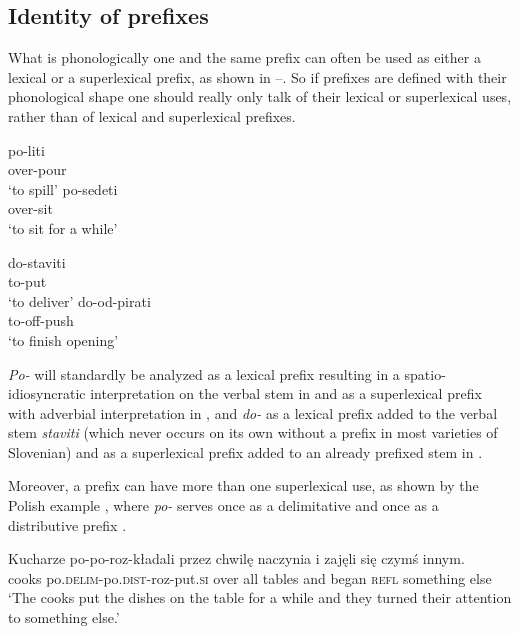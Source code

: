 \documentclass[output=paper,colorlinks,citecolor=brown]{langscibook}
\begin{document}
\subsection{Identity of prefixes}\label{sec:whatWeKnowSlo}
 
What is phonologically one and the same prefix can often be used as either a lexical or a superlexical prefix, as shown in --. So if prefixes are defined with their phonological shape one should really only talk of their lexical or superlexical uses, rather than of lexical and superlexical prefixes.

\ea \label{ex:lexPOsuperPO}
\ea 
\gll po-liti \\
 {over}-pour\\
 \glt `to spill'\label{ex:lexPOsuperPOlex}
\ex \gll po-sedeti \\
 {over}-sit\\
\glt `to sit for a while'\label{ex:lexPOsuperPOsup} 
\z 
\z

\ea \label{ex:lexNAsuperNA}
\ea
\gll do-staviti \\
 {to}-put\\
 \glt `to deliver' \label{ex:lexDOsup}
\ex \gll do-od-pirati \\
 {to}-{off}-push \\
\glt `to finish opening' \label{ex:superDOlex}
\z 
\z
 
\noindent \textit{Po-} will standardly be analyzed as a lexical prefix resulting in a spatio-id\-i\-o\-syn\-crat\-ic interpretation on the verbal stem in  and as a superlexical prefix with adverbial interpretation in  , and \textit{do-} as a lexical prefix added to the verbal stem \textit{staviti} (which never occurs on its own without a prefix in most varieties of Slovenian) and as a superlexical prefix added to an already prefixed stem in . 

Moreover, a prefix can have more than one superlexical use, as shown by the Polish example , where \textit{po-} serves once as a delimitative and once as a distributive prefix \citep[cf. also][]{zaucer2009vp}.

\ea
\gll Kucharze po-po-roz-kładali  przez chwilę naczynia i zajęli się czymś innym.\\ 
cooks po.\textsc{delim}-po.\textsc{dist}-roz-put.\textsc{si} over all tables and began \textsc{refl} something else\\ 
\glt `The cooks put the dishes on the table for a while and they turned their attention to something else.’ \label{ex:PoPoRozKlimek} \\\hfill \citep[Polish;][]{KlimekJankowskaBlaszczak2022}
\z 
\end{document}

